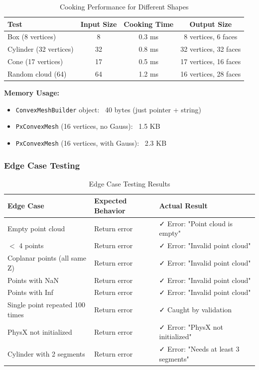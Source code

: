 \begin{table}[h]
\centering
\begin{tabular}{|l|c|c|c|}
\hline
\textbf{Test} & \textbf{Input Size} & \textbf{Cooking Time} & \textbf{Output Size} \\
\hline
Box (8 vertices) & 8 & 0.3 ms & 8 vertices, 6 faces \\
\hline
Cylinder (32 vertices) & 32 & 0.8 ms & 32 vertices, 32 faces \\
\hline
Cone (17 vertices) & 17 & 0.5 ms & 17 vertices, 16 faces \\
\hline
Random cloud (64) & 64 & 1.2 ms & 16 vertices, 28 faces \\
\hline
\end{tabular}
\caption{Cooking Performance for Different Shapes}
\end{table}

\textbf{Memory Usage:}
\begin{itemize}
    \item \texttt{ConvexMeshBuilder} object: ~40 bytes (just pointer + string)
    \item \texttt{PxConvexMesh} (16 vertices, no Gauss): ~1.5 KB
    \item \texttt{PxConvexMesh} (16 vertices, with Gauss): ~2.3 KB
\end{itemize}

\subsubsection{Edge Case Testing}

\begin{table}[h]
\centering
\small
\begin{tabular}{|p{5cm}|p{5cm}|p{4cm}|}
\hline
\textbf{Edge Case} & \textbf{Expected Behavior} & \textbf{Actual Result} \\
\hline
Empty point cloud & Return error & ✓ Error: "Point cloud is empty" \\
\hline
$<$ 4 points & Return error & ✓ Error: "Invalid point cloud" \\
\hline
Coplanar points (all same Z) & Return error & ✓ Error: "Invalid point cloud" \\
\hline
Points with NaN & Return error & ✓ Error: "Invalid point cloud" \\
\hline
Points with Inf & Return error & ✓ Error: "Invalid point cloud" \\
\hline
Single point repeated 100 times & Return error & ✓ Caught by validation \\
\hline
PhysX not initialized & Return error & ✓ Error: "PhysX not initialized" \\
\hline
Cylinder with 2 segments & Return error & ✓ Error: "Needs at least 3 segments" \\
\hline
\end{tabular}
\caption{Edge Case Testing Results}
\end{table}

